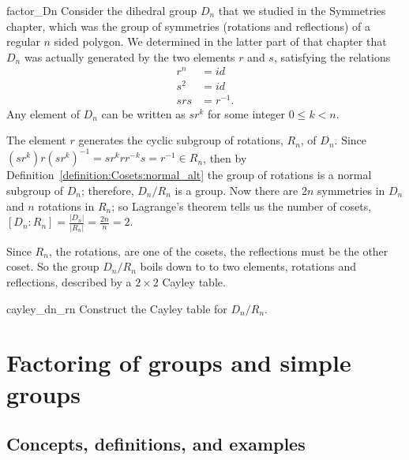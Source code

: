 \begin{example}{factor_Dn}
Consider the dihedral group $D_n$ that we studied in the Symmetries chapter, which was the group of symmetries (rotations and reflections) of a regular $n$ sided polygon.  We determined in the latter part of that chapter that $D_n$ was actually generated by the two elements $r$ and $s$, satisfying the relations 
\begin{align*}
r^n & = id \\
s^2 & = id \\
srs & = r^{-1}.
\end{align*}
Any element of $D_n$ can be written as $sr^k$ for some integer $0 \le k < n$.

The element $r$ generates the cyclic subgroup of rotations,
$R_n$, of $D_n$.  Since $(sr^k)r(sr^k)^{-1} = sr^krr^{-k}s = r^{-1} \in R_n$, then by Definition~\ref{definition:Cosets:normal_alt} the group
of rotations is a normal subgroup of $D_n$; therefore, $D_n / R_n$ is
a group.  Now there are $2n$ symmetries in $D_n$ and $n$ rotations in $R_n$; so Lagrange's theorem tells us the number of cosets, $[D_n : R_n] =  \frac{|D_n|}{|R_n|} = \frac{2n}{n} =2$.  

Since $R_n$, the rotations, are one of the cosets, the reflections must be the other coset.  So the group $D_n / R_n$ boils down to to two elements, rotations and reflections, described by a $2 \times 2$ Cayley table.  
\end{example}

\begin{exercise}{cayley_dn_rn}
Construct the Cayley table for  $D_n / R_n$. 
\end{exercise}


 
\section{Factoring of groups and simple groups}
\label{sec:Cosets:FactoringSimpleGroups}
 
\subsection{Concepts, definitions, and examples}
\label{subsec:Cosets:FactoringSimpleGroups:Concept}

